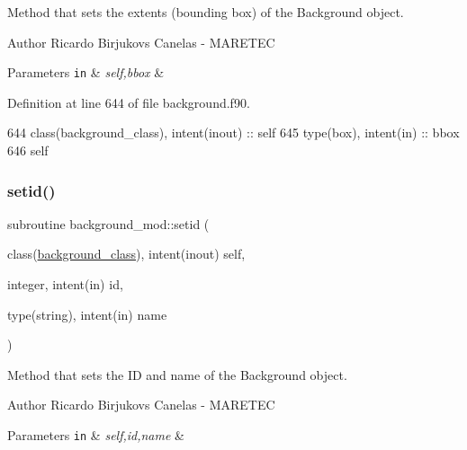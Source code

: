 Method that sets the extents (bounding box) of the Background object. 

\begin{DoxyAuthor}{Author}
Ricardo Birjukovs Canelas -\/ M\+A\+R\+E\+T\+EC 
\end{DoxyAuthor}

\begin{DoxyParams}[1]{Parameters}
\mbox{\tt in}  & {\em self,bbox} & \\
\hline
\end{DoxyParams}


Definition at line 644 of file background.\+f90.


\begin{DoxyCode}
644     \textcolor{keywordtype}{class}(background\_class), \textcolor{keywordtype}{intent(inout)} :: self
645     \textcolor{keywordtype}{type}(box), \textcolor{keywordtype}{intent(in)} :: bbox
646     self%
\end{DoxyCode}
\mbox{\label{namespacebackground__mod_a4feaccf688558d8590ece4f09c65c977}} 
\subsubsection{\texorpdfstring{setid()}{setid()}}
{\footnotesize\ttfamily subroutine background\+\_\+mod\+::setid (\begin{DoxyParamCaption}\item[{class(\mbox{\hyperlink{structbackground__mod_1_1background__class}{background\+\_\+class}}), intent(inout)}]{self,  }\item[{integer, intent(in)}]{id,  }\item[{type(string), intent(in)}]{name }\end{DoxyParamCaption})\hspace{0.3cm}{\ttfamily [private]}}



Method that sets the ID and name of the Background object. 

\begin{DoxyAuthor}{Author}
Ricardo Birjukovs Canelas -\/ M\+A\+R\+E\+T\+EC 
\end{DoxyAuthor}

\begin{DoxyParams}[1]{Parameters}
\mbox{\tt in}  & {\em self,id,name} & \\
\hline
\end{DoxyParams}


